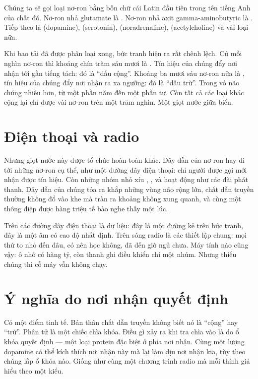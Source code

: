 Chúng ta sẽ gọi loại nơ-ron bằng bốn chữ cái Latin đầu tiên trong tên tiếng Anh của chất đó. Nơ-ron nhả glutamate là . Nơ-ron nhả axit gamma-aminobutyric là . Tiếp theo là  (dopamine),  (serotonin),  (noradrenaline),  (acetylcholine) và vài loại nữa.

Khi bao tải đã được phân loại xong, bức tranh hiện ra rất chênh lệch. Cứ mỗi nghìn nơ-ron thì khoảng chín trăm sáu mươi là . Tín hiệu của chúng đẩy nơi nhận tới gần tiếng tách: đó là ``dấu cộng''. Khoảng ba mươi sáu nơ-ron nữa là , tín hiệu của chúng đẩy nơi nhận ra xa ngưỡng: đó là ``dấu trừ''. Trong vỏ não chúng nhiều hơn, từ một phần năm đến một phần tư. Còn tất cả các loại khác cộng lại chỉ được vài nơ-ron trên một trăm nghìn. Một giọt nước giữa biển.

\section*{Điện thoại và radio}

Nhưng giọt nước này được tổ chức hoàn toàn khác. Dây dẫn của nơ-ron  hay  đi tới những nơ-ron cụ thể, như một đường dây điện thoại: chỉ người được gọi mới nhận được tín hiệu. Còn những nhóm nhỏ xíu , ,  và  hoạt động như các đài phát thanh. Dây dẫn của chúng tỏa ra khắp những vùng não rộng lớn, chất dẫn truyền thường không đổ vào khe mà tràn ra khoảng không xung quanh, và cùng một thông điệp được hàng triệu tế bào nghe thấy một lúc.

Trên các đường dây điện thoại là dữ liệu: đây là một đường kẻ trên bức tranh, đây là một âm có cao độ nhất định. Trên sóng radio là các thiết lập chung: mọi thứ to nhỏ đến đâu, có nên học không, đã đến giờ ngủ chưa. Máy tính nào cũng vậy: ô nhớ có hàng tỷ, còn thanh ghi điều khiển chỉ một nhúm. Nhưng thiếu chúng thì cỗ máy vẫn không chạy.

\section*{Ý nghĩa do nơi nhận quyết định}

Có một điểm tinh tế. Bản thân chất dẫn truyền không biết nó là ``cộng'' hay ``trừ''. Phân tử là một chiếc chìa khóa. Điều gì xảy ra khi tra chìa vào là do ổ khóa quyết định --- một loại protein đặc biệt ở phía nơi nhận. Cùng một lượng dopamine có thể kích thích nơi nhận này mà lại làm dịu nơi nhận kia, tùy theo chúng lắp ổ khóa nào. Giống như cùng một chương trình radio mà mỗi thính giả hiểu theo một kiểu.

